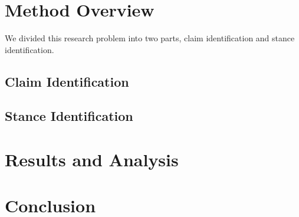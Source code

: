 \documentclass[11pt,a4paper]{article}
\begin{document}
\section{Method Overview}
We divided this research problem into two parts, claim identification and stance identification.
\subsection{Claim Identification}
\subsection{Stance Identification}
\section{Results and Analysis}
\section{Conclusion}


%
%


\end{document}
